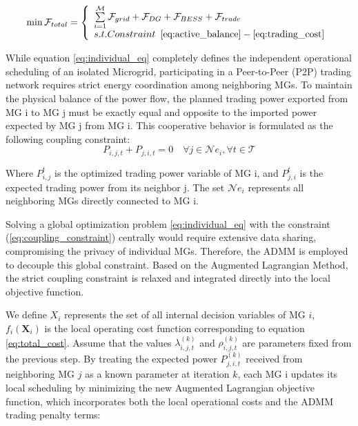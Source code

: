 \documentclass[preprint,12pt]{elsarticle}
\begin{document}
\begin{equation}
\min \mathcal{F}_{total} =
\left\{ \begin{array}{l}
\sum\limits_{i=1}^{\mathcal{M}} \mathcal{F}_{grid} + \mathcal{F}_{DG} + \mathcal{F}_{BESS} + \mathcal{F}_{trade}\\
s.t. Constraint \,\,\,\eqref{eq:active_balance} - \eqref{eq:trading_cost}\,
\end{array} \right.
\label{eq:individual_eq}
\end{equation}

While equation \eqref{eq:individual_eq} completely defines the independent operational scheduling of
an isolated Microgrid, participating in a Peer-to-Peer (P2P) trading network
requires strict energy coordination among neighboring MGs. To maintain the
physical balance of the power flow, the planned trading power exported from MG i
to MG j must be exactly equal and opposite to the imported power expected by MG
j from MG i. This cooperative behavior is formulated as the following coupling
constraint: 
\begin{equation} 
P_{i,j,t} + P_{j,i,t} = 0 \quad \forall j \in
\mathcal{N}e_i, \forall t \in \mathcal{T} \label{eq:coupling_constraint}
\end{equation} 

Where $P_{i,j}^{t}$ is the optimized trading power variable of MG i, and $P_{j,i}^t$ is the expected trading power from its neighbor j. The set $\mathcal{N}e_i$ represents all neighboring MGs directly connected to MG i.

Solving a global optimization problem \eqref{eq:individual_eq} with the constraint (\ref{eq:coupling_constraint}) centrally would require extensive data sharing,
compromising the privacy of individual MGs. Therefore, the ADMM is employed to decouple this global constraint.
Based on the Augmented Lagrangian Method, the strict coupling constraint is relaxed and integrated directly into the local objective function.

We define $X_i$ represents the set of all internal decision variables of MG $i$, $f_i(\mathbf{X}_i)$ is the local operating cost function corresponding to equation \eqref{eq:total_cost}. Assume that the values $\lambda_{i,j,t}^{(k)}$ and $\rho_{i,j,t}^{(k)}$ are parameters fixed from the previous step. By treating the expected power $P_{j,i,t}^{(k)}$ received from neighboring MG $j$ as a known parameter at iteration $k$, each MG i updates its local scheduling by minimizing the new Augmented Lagrangian objective function, which incorporates both the local operational costs and the ADMM trading penalty terms: 
\end{document}
